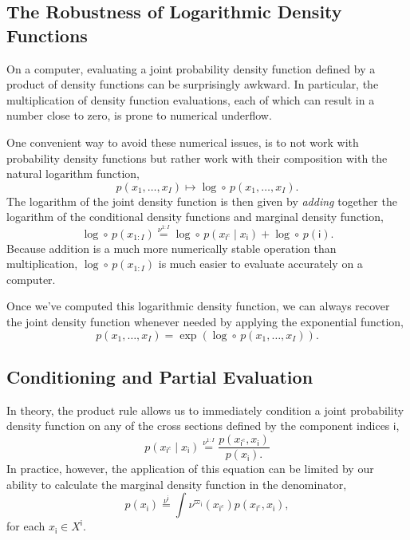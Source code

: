 \documentclass[
  letterpaper,
  DIV=11,
  numbers=noendperiod]{scrartcl}
\begin{document}
\subsection{The Robustness of Logarithmic Density
Functions}\label{the-robustness-of-logarithmic-density-functions}

On a computer, evaluating a joint probability density function defined
by a product of density functions can be surprisingly awkward. In
particular, the multiplication of density function evaluations, each of
which can result in a number close to zero, is prone to numerical
underflow.

One convenient way to avoid these numerical issues, is to not work with
probability density functions but rather work with their composition
with the natural logarithm function, \[
p( x_{1}, \ldots, x_{I} )
\mapsto
\log \circ \, p( x_{1}, \ldots, x_{I} ).
\] The logarithm of the joint density function is then given by
\emph{adding} together the logarithm of the conditional density
functions and marginal density function, \[
\log \circ \,  p( x_{1:I} )
\overset{ \nu^{1:I} }{=}
\log \circ \, p( x_{ \mathsf{i}^{c} } \mid
   x_{ \mathsf{i} } )
+ \log \circ \, p( \mathsf{i} ).
\] Because addition is a much more numerically stable operation than
multiplication, \(\log \circ \, p( x_{1:I} )\) is much easier to
evaluate accurately on a computer.

Once we've computed this logarithmic density function, we can always
recover the joint density function whenever needed by applying the
exponential function, \[
p( x_{1}, \ldots, x_{I} )
=
\exp \left( \log \circ \, p( x_{1}, \ldots, x_{I} ) \right).
\]

\subsection{Conditioning and Partial
Evaluation}\label{sec:cond-part-eval}

In theory, the product rule allows us to immediately condition a joint
probability density function on any of the cross sections defined by the
component indices \(\mathsf{i}\), \[
p( x_{\mathsf{i}^{c}} \mid x_{ \mathsf{i} } )
\overset{ \nu^{1:I} }{=}
\frac{
  p( x_{\mathsf{i}^{c}}, x_{ \mathsf{i} } )
}{
  p( x_{ \mathsf{i} } ).
}
\] In practice, however, the application of this equation can be limited
by our ability to calculate the marginal density function in the
denominator, \[
p( x_{ \mathsf{i} } )
\overset{ \nu^{\mathsf{i}} }{=}
\int \nu^{\varpi_{\mathsf{i}}} ( x_{\mathsf{i}^{c}} )
p( x_{\mathsf{i}^{c}}, x_{ \mathsf{i} } ),
\] for each \(x_{ \mathsf{i} } \in X^{ \mathsf{i} }\).
\end{document}
